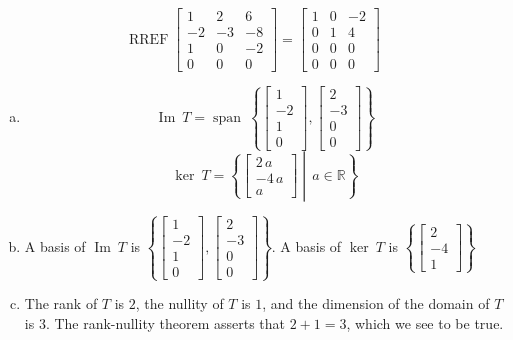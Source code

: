 \begin{exerciseAnswer} 


\[\operatorname{RREF} \left[\begin{array}{ccc}
1 & 2 & 6 \\
-2 & -3 & -8 \\
1 & 0 & -2 \\
0 & 0 & 0
\end{array}\right] = \left[\begin{array}{ccc}
1 & 0 & -2 \\
0 & 1 & 4 \\
0 & 0 & 0 \\
0 & 0 & 0
\end{array}\right] \]


\begin{enumerate}[(a)]
\item \[\operatorname{Im}\ T = \operatorname{span}\  \left\{ \left[\begin{array}{c}
1 \\
-2 \\
1 \\
0
\end{array}\right] , \left[\begin{array}{c}
2 \\
-3 \\
0 \\
0
\end{array}\right] \right\} \]\[\operatorname{ker}\ T =  \left\{ \left[\begin{array}{c}
2 \, a \\
-4 \, a \\
a
\end{array}\right] \middle|\,a\in\mathbb{R}\right\} \]
\item  A basis of \(\operatorname{Im}\ T\) is \( \left\{ \left[\begin{array}{c}
1 \\
-2 \\
1 \\
0
\end{array}\right] , \left[\begin{array}{c}
2 \\
-3 \\
0 \\
0
\end{array}\right] \right\} \). A basis of \(\operatorname{ker}\ T\) is \( \left\{ \left[\begin{array}{c}
2 \\
-4 \\
1
\end{array}\right] \right\} \)
\item  The rank of \(T\) is \( 2 \), the nullity of \(T\) is \( 1 \), and the dimension of the domain of \(T\) is \( 3 \). The rank-nullity theorem asserts that \( 2 + 1 = 3 \), which we see to be true. 
\end{enumerate}
    
\end{exerciseAnswer}
    
